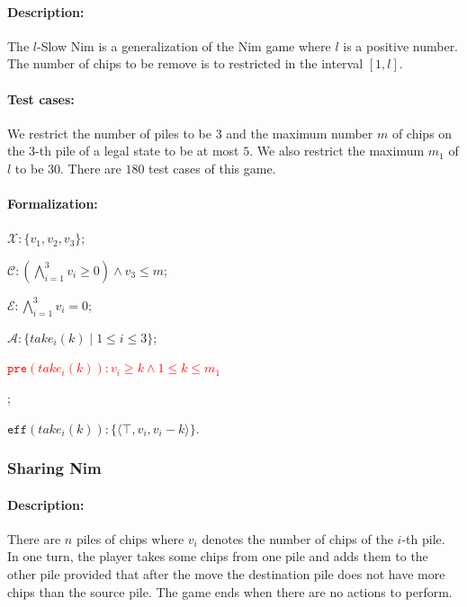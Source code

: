 \documentclass[review]{elsarticle}
\newcommand{\set}[1]{\{ #1 \}}
\newcommand{\tuple}[1]{\langle {#1} \rangle}
\newcommand{\true}{\top}
\newcommand{\statevar}{\mathcal{X}}
\newcommand{\act}{\mathcal{A}}
\newcommand{\constraint}{\mathcal{C}}
\newcommand{\estate}{\mathcal{E}}
\newcommand{\pre}{\mathtt{pre}}
\newcommand{\eff}{\mathtt{eff}}
\begin{document}
\paragraph{Description:} 
The $l$-Slow Nim is a generalization of the Nim game where $l$ is a positive number.
The number of chips to be remove is to restricted in the interval $[1, l]$.

\paragraph{Test cases:}
We restrict the number of piles to be $3$ and the maximum number $m$ of chips on the 3-th pile of a legal state to be at most $5$.
We also restrict the maximum $m_1$ of $l$ to be $30$.
There are $180$ test cases of this game.



\paragraph{Formalization:}

\begin{itemize}
	\item $\statevar: \set{v_1, v_2, v_3} $;
	\item $\constraint: (\bigwedge_{i=1}^{3} v_i \ge 0) \wedge v_3 \le m$;
	\item $\estate: \bigwedge_{i=1}^{3} v_i = 0$;
	\item $\act:\set{take_i(k) {\mid} 1 \le i \le 3}$;
	\textcolor{red}{\item $\pre(take_i(k)) : v_i \ge k \wedge 1 \le k \le m_1 $};

	\item $\eff(take_i(k)) :  \set{\tuple{\true, v_i, v_i - k}}$.
\end{itemize}


\subsubsection{Sharing Nim \protect\cite{Ho2016}}

\paragraph{Description:} 
There are $n$ piles of chips where $v_i$ denotes the number of chips of the $i$-th pile.
In one turn, the player takes some chips from one pile and adds them to the other pile provided that after the move the destination pile does not have more chips than the source pile. 
The game ends when there are no actions to perform.
\end{document}
